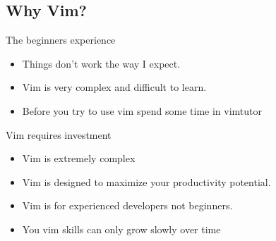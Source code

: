 \documentclass{beamer}
\begin{document}
    \subsection{Why Vim?}
    \begin{frame}{The beginners experience}
        \begin{itemize}
            \item <alert@+> Things don't work the way I expect.
            \item <alert@+> Vim is very complex and difficult to learn.
            \item <alert@+> Before you try to use vim spend some time in vimtutor
        \end{itemize}
    \end{frame}
    \begin{frame}{Vim requires investment}
        \begin{itemize}
            \item <alert@+> Vim is extremely complex %
            \item <alert@+> Vim is designed to maximize your productivity potential.
            \item <alert@+> Vim is for experienced developers not beginners.
            \item <alert@+> You vim skills can only grow slowly over time
        \end{itemize}
    \end{frame}
\end{document}
